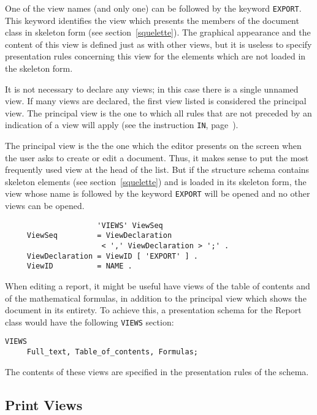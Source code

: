 One of the view names (and only one) can be followed by the keyword
{\tt EXPORT}.  This keyword identifies the view which presents the
members of the document class in skeleton form (see
section~\ref{squelette}).  The graphical appearance  and the content
of this view is defined just as with other views, but it is useless
to specify presentation rules concerning this view for the elements
which are not loaded in the skeleton form.

It is not necessary to declare any views; in this case there is a
single unnamed view.  If many views are declared, the first view
listed is considered the principal view.  The principal view is the
one to which all rules that are not preceded by an indication of a
view will apply (see the instruction {\tt IN},
page~\pageref{instrin}).

The principal view is the the one which the editor presents on the
screen when the user asks to create or edit a document.  Thus, it
makes sense to put the most frequently used view at the head of the
list.  But if the structure schema contains skeleton elements (see
section~\ref{squelette}) and is loaded in its skeleton form, the view
whose name is followed by the keyword {\tt EXPORT} will be opened and no
other views can be opened.

\begin{verbatim}
                     'VIEWS' ViewSeq
     ViewSeq         = ViewDeclaration
                      < ',' ViewDeclaration > ';' .
     ViewDeclaration = ViewID [ 'EXPORT' ] .
     ViewID          = NAME .
\end{verbatim}

\begin{example}
When editing a report, it might be useful have views of the table of
contents and of the mathematical formulas, in addition to the
principal view which shows the document in its entirety.  To achieve
this, a presentation schema for the Report class would have the
following {\tt VIEWS} section:

\begin{verbatim}
VIEWS
     Full_text, Table_of_contents, Formulas;
\end{verbatim}

The contents of these views are specified in the presentation rules of
the schema.
\end{example}

\subsection{Print Views}

